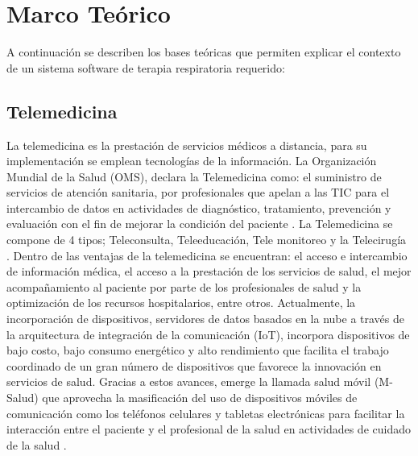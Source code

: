 

\section{Marco Te\'orico}
A continuaci\'on se describen los bases te\'oricas que permiten explicar el contexto de un sistema software de terapia respiratoria requerido:

\subsection{Telemedicina}


La telemedicina es la prestaci\'on de servicios m\'edicos a distancia, para su implementaci\'on se emplean tecnolog\'ias de la informaci\'on. La Organizaci\'on Mundial de la Salud (OMS), declara la Telemedicina como: el suministro de servicios de atenci\'on sanitaria, por profesionales que apelan a las TIC para el intercambio de datos en actividades de diagn\'ostico, tratamiento, prevenci\'on y evaluaci\'on con el fin de mejorar la condici\'on del paciente \cite{19}. La Telemedicina se compone de 4 tipos; Teleconsulta, Teleeducaci\'on, Tele monitoreo y la Telecirug\'ia \cite{20}. Dentro de las ventajas de la telemedicina se encuentran: el acceso e intercambio de informaci\'on m\'edica, el acceso a la prestaci\'on de los servicios de salud, el mejor acompa\~{n}amiento al paciente por parte de los profesionales de salud y la optimizaci\'on de los recursos hospitalarios, entre otros. Actualmente, la incorporaci\'on de dispositivos, servidores de datos basados en la nube a trav\'es de la arquitectura de integraci\'on de la comunicaci\'on (IoT), incorpora dispositivos de bajo costo, bajo consumo energ\'etico y alto rendimiento que facilita el trabajo coordinado de un gran n\'umero de dispositivos que favorece la innovaci\'on en servicios de salud. Gracias a estos avances, emerge la llamada salud m\'ovil (M-Salud) que aprovecha la masificaci\'on del uso de dispositivos m\'oviles de comunicaci\'on como los tel\'efonos celulares y tabletas electr\'onicas para facilitar la interacci\'on entre el paciente y el profesional de la salud en actividades de cuidado de la salud \cite{21}.



